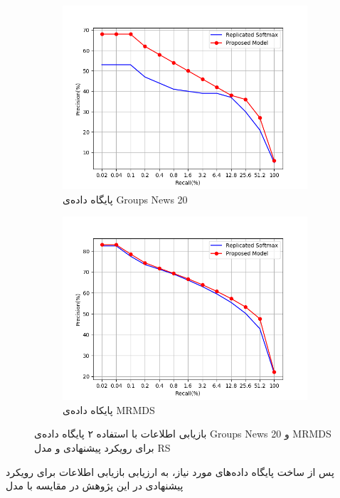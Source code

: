 \begin{figure}[!b]
	\centering
	\begin{subfigure}{.45\textwidth}
		\includegraphics[scale = .4]{chap5-img/ir-1}
		\caption{پایگاه داده‌ی Groups News 20}
		\label{chap5-fig7sub1}
	\end{subfigure}		
	\begin{subfigure}{.45\textwidth}
		\includegraphics[scale =.4]{chap5-img/ir-2}
		\caption{ پایکاه داده‌ی MRMDS}
		\label{chap5-fig7sub2}
	\end{subfigure}
	\caption{بازیابی اطلاعات با استفاده ۲ پایگاه داده‌ی Groups News 20 و MRMDS برای رویکرد پیشنهادی و مدل RS}
	\label{chap5-fig7}
\end{figure}
پس از ساخت پایگاه داده‌های مورد نیاز، به ارزیابی بازیابی اطلاعات برای رویکرد پیشنهادی در این پژوهش در مقایسه با مدل
